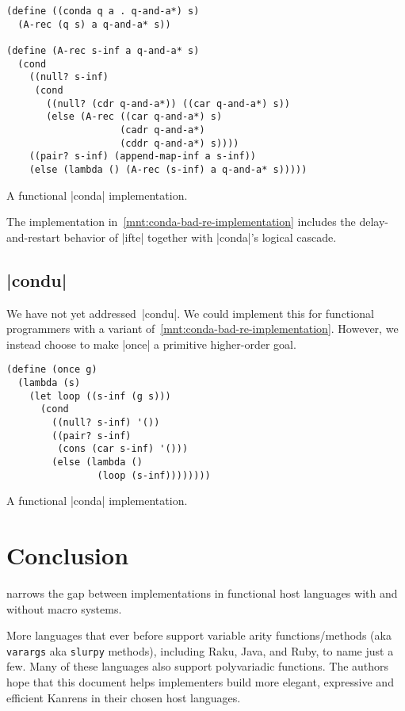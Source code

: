 \documentclass[sigplan,screen,draft,anonymous,review,natbib=false]{acmart}
\begin{document}
\begin{listing}
  \begin{verbatim}
(define ((conda q a . q-and-a*) s)
  (A-rec (q s) a q-and-a* s))

(define (A-rec s-inf a q-and-a* s)
  (cond
    ((null? s-inf)
     (cond
       ((null? (cdr q-and-a*)) ((car q-and-a*) s))
       (else (A-rec ((car q-and-a*) s)
                    (cadr q-and-a*)
                    (cddr q-and-a*) s))))
    ((pair? s-inf) (append-map-inf a s-inf))
    (else (lambda () (A-rec (s-inf) a q-and-a* s)))))
  \end{verbatim}
  \caption{A functional \rackinline|conda| implementation.}
  \label{mnt:conda-bad-re-implementation}
\end{listing}

The implementation in~\cref{mnt:conda-bad-re-implementation} includes
the delay-and-restart behavior of \rackinline|ifte| together with
\rackinline|conda|'s logical cascade.

\subsection{\rackinline|condu|}

We have not yet addressed~\rackinline|condu|. We could implement this
for functional programmers with a variant
of~\cref{mnt:conda-bad-re-implementation}. However, we instead choose
to make \rackinline|once| a primitive higher-order goal.

\begin{listing}
  \begin{verbatim}
(define (once g)
  (lambda (s)
    (let loop ((s-inf (g s)))
      (cond
        ((null? s-inf) '())
        ((pair? s-inf)
         (cons (car s-inf) '()))
        (else (lambda ()
                (loop (s-inf))))))))
  \end{verbatim}
  \caption{A functional \rackinline|conda| implementation.}
  \label{mnt:conda-bad-re-implementation}
\end{listing}

\section{Conclusion}\label{sec:conclusion}

narrows the gap between implementations in functional host languages
with and without macro systems.

More languages that ever before support variable arity
functions/methods (aka \verb|varargs| aka \verb|slurpy| methods),
including Raku, Java, and Ruby, to name just a few. Many of these
languages also support polyvariadic functions. The authors hope that
this document helps implementers build more elegant, expressive and
efficient Kanrens in their chosen host languages.
\end{document}
